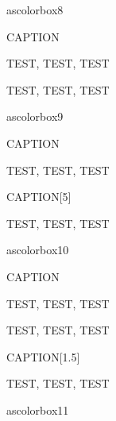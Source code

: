 ascolorbox8

\begin{ascolorbox8}{CAPTION}

TEST, TEST, TEST

\end{ascolorbox8}

\begin{ascolorbox8}{}

TEST, TEST, TEST

\end{ascolorbox8}

ascolorbox9

\begin{ascolorbox9}{CAPTION}

TEST, TEST, TEST

\end{ascolorbox9}




\begin{ascolorbox9}{CAPTION}[5]

TEST, TEST, TEST

\end{ascolorbox9}

ascolorbox10

\begin{ascolorbox10}{CAPTION}

TEST, TEST, TEST

\end{ascolorbox10}

\begin{ascolorbox10}{}

TEST, TEST, TEST

\end{ascolorbox10}

\begin{ascolorbox10}{CAPTION}[1.5]

TEST, TEST, TEST

\end{ascolorbox10}

ascolorbox11

